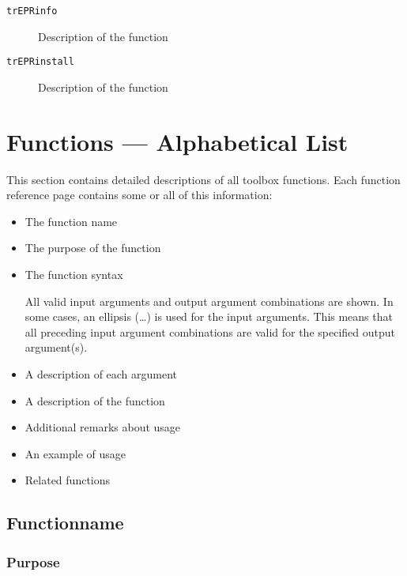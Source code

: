 \documentclass[a4paper]{refrep}
\begin{document}
\begin{description}
  \item[\texttt{trEPRinfo}] Description of the function
  \item[\texttt{trEPRinstall}] Description of the function
\end{description}


\clearpage

\section{Functions --- Alphabetical List}


This section contains detailed descriptions of all toolbox functions. Each
function reference page contains some or all of this information:

\begin{itemize}
  \item The function name
  \item The purpose of the function
  \item The function syntax
  
  All valid input arguments and output argument combinations are shown. In some
  cases, an ellipsis (\ldots) is used for the input arguments. This means that
  all preceding input argument combinations are valid for the specified output
  argument(s).
  
  \item A description of each argument
  \item A description of the function
  \item Additional remarks about usage
  \item An example of usage
  \item Related functions
\end{itemize}


\clearpage

\renewcommand{\subsectionmark}[1]{ 
	\markboth{#1}{#1}
} 

\subsection{Functionname}

\subsubsection{Purpose}
\end{document}
